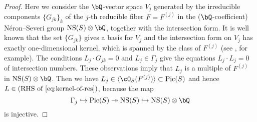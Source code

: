 \documentclass[12pt]{amsart}
\numberwithin{equation}{section}
\theoremstyle{plain}
\theoremstyle{definition}
\DeclareMathOperator{\Pic}{\mathrm{Pic}}
\DeclareMathOperator{\NS}{\mathrm{NS}}
\begin{document}
\begin{proof}
    Here we consider the $\bQ$-vector space $V_j$ generated by the irreducible components $\{G_{jk}\}_k$ of the $j$-th reducible fiber $F = F^{(j)}$ in the ($\bQ$-coefficient) N\'{e}ron--Severi group $\NS(S) \otimes \bQ$, together with the intersection form.
    It is well known that the set $\{G_{jk}\}$ gives a basis for $V_j$ and the intersection form on $V_j$ has exactly one-dimensional kernel, which is spanned by the class of $F^{(j)}$ (see \cite{MR1078016}, for example).
    The conditions $L_j \cdot G_{jk} = 0$ and $L_j \in \Gamma_j$ give the equations $L_j \cdot L_j = 0$ of intersection numbers.
    These observations imply that $L_j$ is a multiple of $F^{(j)}$ in $\NS(S) \otimes \bQ$.
    Then we have $L_j \in \langle \cO_S(F^{(j)}) \rangle \subset \Pic(S)$ and hence $L \in (\text{RHS of \eqref{eq:kernel-of-res}})$, because the map
    \begin{equation}
        \Gamma_j \hookrightarrow \Pic(S) \twoheadrightarrow \NS(S) \hookrightarrow \NS(S) \otimes \bQ
    \end{equation}
    is injective.
\end{proof}
\end{document}
